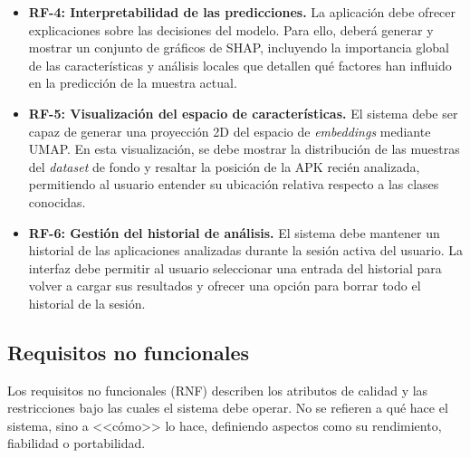 \begin{itemize}
	\item \textbf{RF-4: Interpretabilidad de las predicciones.} La aplicación debe ofrecer explicaciones sobre las decisiones del modelo. Para ello, deberá generar y mostrar un conjunto de gráficos de SHAP, incluyendo la importancia global de las características y análisis locales que detallen qué factores han influido en la predicción de la muestra actual.
	
	\item \textbf{RF-5: Visualización del espacio de características.} El sistema debe ser capaz de generar una proyección 2D del espacio de \textit{embeddings} mediante UMAP. En esta visualización, se debe mostrar la distribución de las muestras del \textit{dataset} de fondo y resaltar la posición de la APK recién analizada, permitiendo al usuario entender su ubicación relativa respecto a las clases conocidas.
	
	\item \textbf{RF-6: Gestión del historial de análisis.} El sistema debe mantener un historial de las aplicaciones analizadas durante la sesión activa del usuario. La interfaz debe permitir al usuario seleccionar una entrada del historial para volver a cargar sus resultados y ofrecer una opción para borrar todo el historial de la sesión.
\end{itemize}

\subsection{Requisitos no funcionales}
Los requisitos no funcionales (RNF) describen los atributos de calidad y las restricciones bajo las cuales el sistema debe operar. No se refieren a qué hace el sistema, sino a <<cómo>> lo hace, definiendo aspectos como su rendimiento, fiabilidad o portabilidad.

